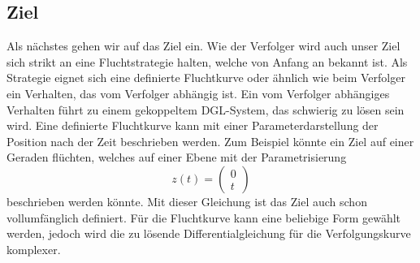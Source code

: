 \subsection{Ziel
\label{lambertw:subsection:Ziel}}
Als nächstes gehen wir auf das Ziel ein.
Wie der Verfolger wird auch unser Ziel sich strikt an eine Fluchtstrategie halten, welche von Anfang an bekannt ist.
Als Strategie eignet sich eine definierte Fluchtkurve oder ähnlich wie beim Verfolger ein Verhalten, das vom Verfolger abhängig ist.
Ein vom Verfolger abhängiges Verhalten führt zu einem gekoppeltem DGL-System, das schwierig zu lösen sein wird.
Eine definierte Fluchtkurve kann mit einer Parameterdarstellung der Position nach der Zeit beschrieben werden.
Zum Beispiel könnte ein Ziel auf einer Geraden flüchten, welches auf einer Ebene mit der Parametrisierung
%
\begin{equation}
    z(t)
    =
    \left( \begin{array}{c} 0 \\  t \end{array} \right)
\end{equation}
%
beschrieben werden könnte.
Mit dieser Gleichung ist das Ziel auch schon vollumfänglich definiert.
Für die Fluchtkurve kann eine beliebige Form gewählt werden, jedoch wird die zu lösende Differentialgleichung für die Verfolgungskurve komplexer.




